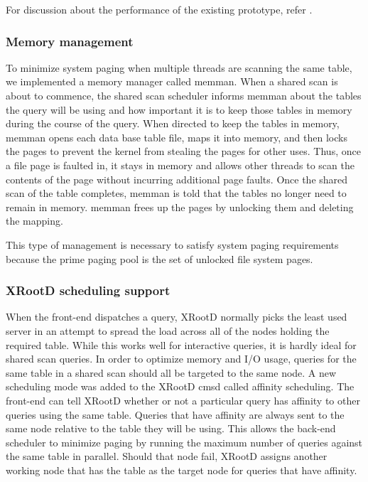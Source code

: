 \documentclass[DM,lsstdraft,toc]{lsstdoc}
\begin{document}
For discussion about the performance of the existing prototype, refer
.

\subsubsection{Memory management}\label{shared-scan-memory-management}

To minimize system paging when multiple threads are scanning the same table,
we implemented a memory manager called memman. When a shared scan is about to
commence, the shared scan scheduler informs memman about the tables the query
will be using and how important it is to keep those tables in memory during
the course of the query. When directed to keep the tables in memory, memman
opens each data base table file, maps it into memory, and then locks the pages
to prevent the kernel from stealing the pages for other uses. Thus, once a
file page is faulted in, it stays in memory and allows other threads to scan
the contents of the page without incurring additional page faults. Once the
shared scan of the table completes, memman is told that the tables no longer
need to remain in memory. memman frees up the pages by unlocking them and
deleting the mapping.

This type of management is necessary to satisfy system paging requirements
because the prime paging pool is the set of unlocked file system pages.

\subsubsection{XRootD scheduling support}\label{shared-scan-xrootd-scheduling-support}

When the front-end dispatches a query, XRootD normally picks the least used
server in an attempt to spread the load across all of the nodes holding the
required table. While this works well for interactive queries, it is hardly
ideal for shared scan queries. In order to optimize memory and I/O usage,
queries for the same table in a shared scan should all be targeted to the same
node. A new scheduling mode was added to the XRootD cmsd called affinity
scheduling. The front-end can tell XRootD whether or not a particular query
has affinity to other queries using the same table. Queries that have affinity
are always sent to the same node relative to the table they will be using.
This allows the back-end scheduler to minimize paging by running the maximum
number of queries against the same table in parallel. Should that node fail,
XRootD assigns another working node that has the table as the target node for
queries that have affinity.
\end{document}
